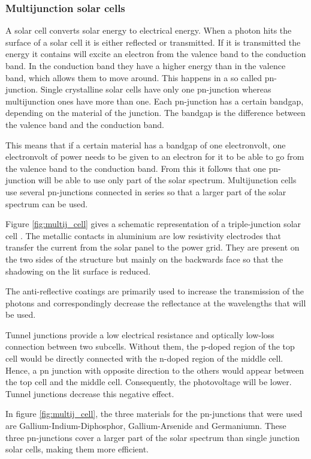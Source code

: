 \clearpage
\subsubsection{Multijunction solar cells}
A solar cell converts solar energy to electrical energy. When a photon hits the surface of a solar cell it is either reflected or transmitted.
If it is transmitted the energy it contains will excite an electron from the valence band to the conduction band. In the conduction band they have a higher energy than in the valence band, which allows them to move around. This happens in a so called pn-junction. Single crystalline solar cells have only one pn-junction whereas multijunction ones have more than one. Each pn-junction has a certain bandgap, depending on the material of the junction. The bandgap is the difference between the valence band and the conduction band.

This means that if a certain material has a bandgap of one electronvolt, one electronvolt of power needs to be given to an electron for it to be able to go from the valence band to the conduction band. From this it follows that one pn-junction will be able to use only part of the solar spectrum. Multijunction cells use several pn-junctions connected in series so that a larger part of the solar spectrum can be used.

Figure \ref{fig:multij_cell} gives a schematic representation of a triple-junction solar cell \cite{spectrolab}. The metallic contacts in aluminium are low resistivity electrodes that transfer the current from the solar panel to the power grid. They are present on the two sides of the structure but mainly on the backwards face so that the shadowing on the lit surface is reduced.

The anti-reflective coatings are primarily used to increase the transmission of the photons and correspondingly decrease the reflectance at the wavelengths that will be used.

Tunnel junctions provide a low electrical resistance and optically low-loss connection between two subcells. Without them, the p-doped region of the top cell would be directly connected with the n-doped region of the middle cell. Hence, a pn junction with opposite direction to the others would appear between the top cell and the middle cell. Consequently, the photovoltage will be lower. Tunnel junctions decrease this negative effect.

In figure \ref{fig:multij_cell}, the three materials for the pn-junctions that were used are Gallium-Indium-Diphosphor, Gallium-Arsenide and Germaniumn. These three pn-junctions cover a larger part of the solar spectrum than single junction solar cells, making them more efficient.

